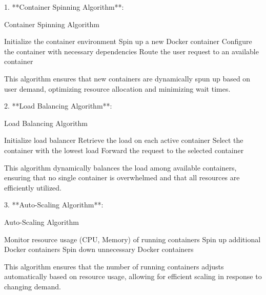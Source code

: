 \documentclass[12pt,a4paper,final]{report}
\begin{document}
1. **Container Spinning Algorithm**:
   \begin{algorithm}[H]
   \caption{Container Spinning Algorithm}
   \begin{algorithmic}[1]
       \STATE Initialize the container environment
               \STATE Spin up a new Docker container
               \STATE Configure the container with necessary dependencies
           \ENDIF
           \STATE Route the user request to an available container
       \ENDFOR
   \end{algorithmic}
   \end{algorithm}

   This algorithm ensures that new containers are dynamically spun up based on user demand, optimizing resource allocation and minimizing wait times.

2. **Load Balancing Algorithm**:
   \begin{algorithm}[H]
   \caption{Load Balancing Algorithm}
   \begin{algorithmic}[1]
       \STATE Initialize load balancer
               \STATE Retrieve the load on each active container
               \STATE Select the container with the lowest load
               \STATE Forward the request to the selected container
           \ENDFOR
       \ENDWHILE
   \end{algorithmic}
   \end{algorithm}

   This algorithm dynamically balances the load among available containers, ensuring that no single container is overwhelmed and that all resources are efficiently utilized.

3. **Auto-Scaling Algorithm**:
   \begin{algorithm}[H]
   \caption{Auto-Scaling Algorithm}
   \begin{algorithmic}[1]
       \STATE Monitor resource usage (CPU, Memory) of running containers
           \STATE Spin up additional Docker containers
           \STATE Spin down unnecessary Docker containers
       \ENDIF
   \end{algorithmic}
   \end{algorithm}

   This algorithm ensures that the number of running containers adjusts automatically based on resource usage, allowing for efficient scaling in response to changing demand.
\end{document}
